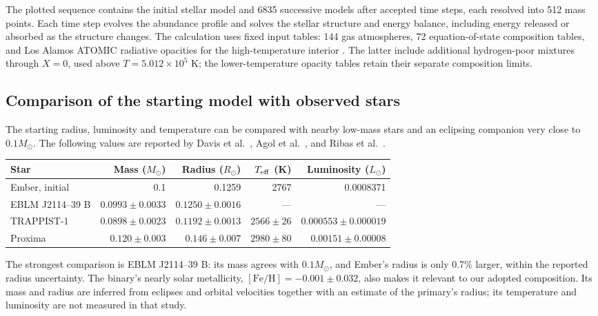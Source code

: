 \documentclass[11pt,letterpaper]{article}
\newcommand{\Ms}{M_\odot}\newcommand{\Rs}{R_\odot}\newcommand{\Ls}{L_\odot}
\begin{document}
The plotted sequence contains the initial stellar model and 6835 successive
models after accepted time steps, each resolved into 512 mass points. Each time
step evolves the abundance profile and solves the stellar structure and energy
balance, including energy released or absorbed as the structure changes.
The calculation uses fixed input tables: 144 gas atmospheres, 72 equation-of-state
composition tables, and Los Alamos ATOMIC radiative opacities for the
high-temperature interior \cite{colgan16,tops}. The latter include additional
hydrogen-poor mixtures through $X=0$, used above $T=5.012\times10^5$ K;
the lower-temperature opacity tables retain their separate composition limits.

\subsection{Comparison of the starting model with observed stars}
The starting radius, luminosity and temperature can be compared with nearby
low-mass stars and an eclipsing companion very close to $0.1\Ms$.
The following values are reported by Davis et al.\ \cite{davis24}, Agol
et al.\ \cite{agol21}, and Ribas et al.\ \cite{ribas17}.

\begin{center}\small\begin{tabular}{@{}lrrrr@{}}\toprule
Star & Mass ($\Ms$) & Radius ($\Rs$) & $T_{\rm eff}$ (K) & Luminosity ($\Ls$) \\\midrule
Ember, initial & 0.1 & 0.1259 & 2767 & 0.0008371 \\
EBLM J2114--39 B & $0.0993\pm0.0033$ & $0.1250\pm0.0016$ & --- & --- \\
TRAPPIST-1 & $0.0898\pm0.0023$ & $0.1192\pm0.0013$ & $2566\pm26$ & $0.000553\pm0.000019$ \\
Proxima & $0.120\pm0.003$ & $0.146\pm0.007$ & $2980\pm80$ & $0.00151\pm0.00008$ \\\bottomrule
\end{tabular}\end{center}

The strongest comparison is EBLM J2114--39 B: its mass agrees with $0.1\Ms$,
and Ember's radius is only 0.7\% larger, within the reported radius uncertainty.
The binary's nearly solar metallicity, $[\mathrm{Fe/H}]=-0.001\pm0.032$,
also makes it relevant to our adopted composition. Its mass and radius are
inferred from eclipses and orbital velocities together with an estimate of the
primary's radius; its temperature and luminosity are not measured in that study.
\end{document}
